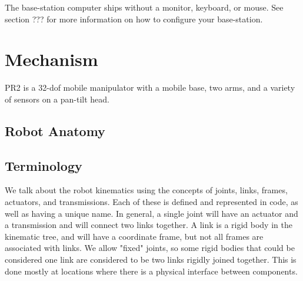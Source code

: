 The base-station computer ships
without a monitor, keyboard, or mouse.  See section ??? for more information on
how to configure your base-station.

\section{Mechanism}
PR2 is a 32-dof mobile manipulator with a mobile base, two arms, and a variety
of sensors on a pan-tilt head.

\subsection{Robot Anatomy}

\subsection{Terminology}
We talk about the robot kinematics using the concepts of joints, links, frames,
actuators, and transmissions.  Each of these is defined and represented in code,
as well as having a unique name.  In general, a single joint will have an
actuator and a transmission and will connect two links together.  A link is a
rigid body in the kinematic tree, and will have a coordinate frame, but not all
frames are associated with links.  We allow "fixed" joints, so some rigid bodies
that could be considered one link are considered to be two links rigidly joined
together.  This is done mostly at locations where there is a physical interface
between components.

